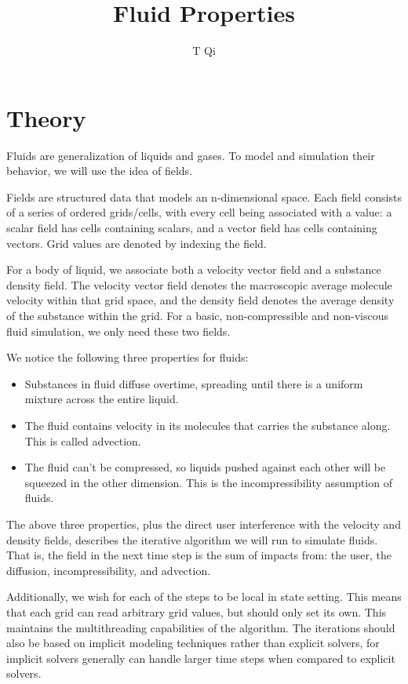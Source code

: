 \documentclass[11pt]{article}
\title{Fluid Properties}
\author{T Qi}
\begin{document}
\maketitle
\newpage


\section{Theory}
Fluids are generalization of liquids and gases. To model and simulation their behavior, we will use the idea of fields.

Fields are structured data that models an n-dimensional space. Each field consists of a series of ordered grids/cells, with every cell being associated with a value: a scalar field has cells containing scalars, and a vector field has cells containing vectors. Grid values are denoted by indexing the field.

For a body of liquid, we associate both a velocity vector field and a substance density field. The velocity vector field denotes the macroscopic average molecule velocity within that grid space, and the density field denotes the average density of the substance within the grid. For a basic, non-compressible and non-viscous fluid simulation, we only need these two fields.

We notice the following three properties for fluids:
\begin{itemize}
	\item Substances in fluid diffuse overtime, spreading until there is a uniform mixture across the entire liquid.
	\item The fluid contains velocity in its molecules that carries the substance along. This is called advection.
	\item The fluid can't be compressed, so liquids pushed against each other will be squeezed in the other dimension. This is the incompressibility assumption of fluids.
\end{itemize}

The above three properties, plus the direct user interference with the velocity and density fields, describes the iterative algorithm we will run to simulate fluids. That is, the field in the next time step is the sum of impacts from: the user, the diffusion, incompressibility, and advection.

Additionally, we wish for each of the steps to be local in state setting. This means that each grid can read arbitrary grid values, but should only set its own. This maintains the multithreading capabilities of the algorithm. The iterations should also be based on implicit modeling techniques rather than explicit solvers, for implicit solvers generally can handle larger time steps when compared to explicit solvers.
\end{document}
